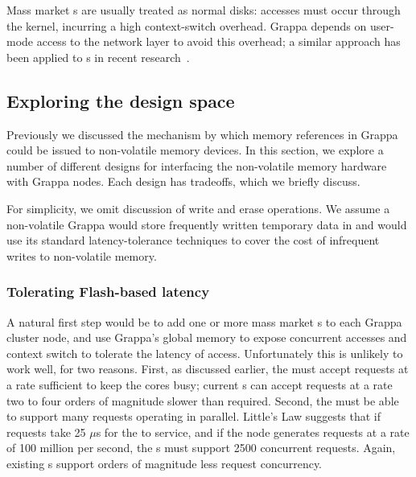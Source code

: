  Mass market \hspace{0.75pt}s are usually treated
as normal disks: accesses must occur through the kernel, incurring a
high context-switch overhead. Grappa depends on user-mode access to
the network layer to avoid this overhead; a similar approach has been applied to \hspace{0.75pt}s in recent research~\cite{caulfield:2012}.

\subsection{Exploring the design space}

Previously we discussed the mechanism by which memory references in
Grappa could be issued to non-volatile memory devices. In this
section, we explore a number of different designs for interfacing the
non-volatile memory hardware with Grappa nodes. Each design has
tradeoffs, which we briefly discuss.

For simplicity, we omit discussion of write and erase operations. We
assume a non-volatile Grappa would store frequently written temporary
data in  and would use its standard latency-tolerance techniques
to cover the cost of infrequent writes to non-volatile memory.

\subsubsection{Tolerating Flash-based  latency} 
A natural first step would be to add one or more mass market \hspace{0.75pt}s to each Grappa
cluster node, and use Grappa's global memory  to expose concurrent
accesses and context switch to tolerate the latency of 
access. Unfortunately this is unlikely to work well, for two
reasons. First, as discussed earlier, the  must accept requests at a rate sufficient to
keep the cores busy; current \hspace{0.75pt}s
can accept requests at a rate two to four orders of magnitude slower than required.
Second, the  must be able to support many requests operating in
parallel. Little's Law suggests that if requests take 25 $\mu$s for
the  to service, and if the node generates requests at a rate of
100 million per second, the \hspace{0.75pt}s must support 2500 concurrent
requests. Again, existing \hspace{0.75pt}s support orders of magnitude less request concurrency.

